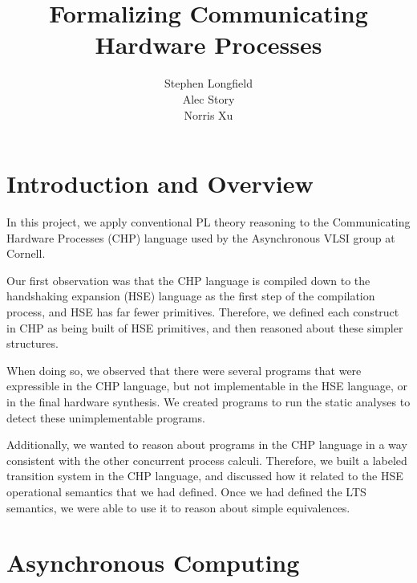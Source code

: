 \documentclass[times, 10pt]{article}
\begin{document}
\title{Formalizing Communicating Hardware Processes}
\author{Stephen Longfield\\Alec Story\\Norris Xu}
\maketitle

\section{Introduction and Overview}

In this project, we apply conventional PL theory reasoning to the Communicating
Hardware Processes (CHP) language used by the Asynchronous VLSI group at
Cornell. 

Our first observation was that the CHP language is compiled down to the
handshaking expansion (HSE) language as the first step of the compilation
process, and HSE has far fewer primitives.  Therefore, we defined each construct
in CHP as being built of HSE primitives, and then reasoned about these simpler
structures.

When doing so, we observed that there were several programs that were
expressible in the CHP language, but not implementable in the HSE language, or
in the final hardware synthesis. We created programs to run the static analyses
to detect these unimplementable programs.

Additionally, we wanted to reason about programs in the CHP language in a way
consistent with the other concurrent process calculi.  Therefore, we built a
labeled transition system in the CHP language, and discussed how it related to
the HSE operational semantics that we had defined.  Once we had defined the LTS
semantics, we were able to use it to reason about simple equivalences.

\section{Asynchronous Computing}
\end{document}

